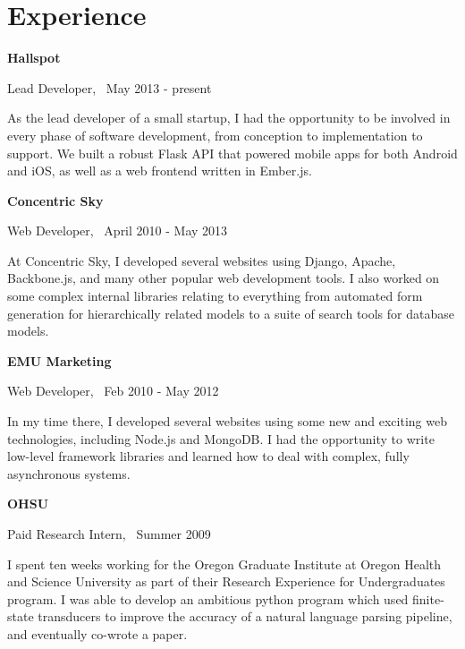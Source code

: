 \documentclass[10pt,letterpaper]{article}
\newenvironment{topic}[1]{
\begin{minipage}[t]{0.15\linewidth}\begin{flushleft}\begin{flushright}\textbf{#1}\end{flushright}\end{flushleft}\end{minipage}\hspace{1em}\vrule\hspace{1em}\begin{minipage}[t]{0.80\linewidth}\begin{flushright}\begin{flushleft}
}{
\end{flushleft}\end{flushright}\end{minipage}\vspace{1em}
}
\begin{document}
\vspace{-2em}
\section{Experience}

\begin{topic}{Hallspot}
    Lead Developer, \ May 2013 - present

    \vspace{1em}

    As the lead developer of a small startup, I had the
    opportunity to be involved in every phase of software development,
    from conception to implementation to support. We built a
    robust Flask API that powered mobile apps for both Android and iOS,
    as well as a web frontend written in Ember.js.
\end{topic}
\vspace{1em}

\begin{topic}{Concentric Sky}
    Web Developer, \ April 2010 - May 2013

    \vspace{1em}

    At Concentric Sky, I developed several websites using Django,
    Apache, Backbone.js, and many other popular web development tools. I
    also worked on some complex internal libraries relating to
    everything from automated form generation for hierarchically related
    models to a suite of search tools for database models.
\end{topic}

\vspace{1em}
\begin{topic}{EMU Marketing}

  Web Developer, \ Feb 2010 - May 2012 

  \vspace{1em}
  
  In my time there, I developed several websites using some new and
  exciting web technologies, including Node.js and MongoDB. I had the
  opportunity to write low-level framework libraries and learned how to
  deal with complex, fully asynchronous systems.
\end{topic}

\vspace{1em}
\begin{topic}{OHSU}
    Paid Research Intern, \ Summer 2009

    \vspace{1em}

    I spent ten weeks working for the Oregon Graduate Institute at
    Oregon Health and Science University as part of their Research
    Experience for Undergraduates program. I was able to develop an
    ambitious python program which used finite-state transducers to
    improve the accuracy of a natural language parsing pipeline, and
    eventually co-wrote a paper.
\end{topic}
\end{document}
